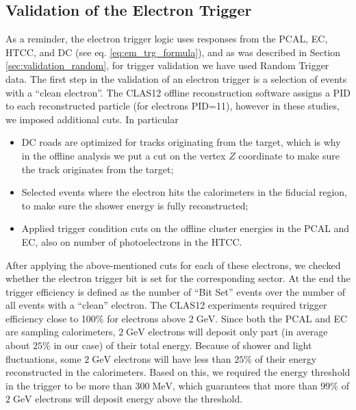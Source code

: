 \subsection{Validation of the Electron Trigger}
\label{electron_trigger_validation}
As a reminder, the electron trigger logic uses responses from the PCAL, EC, HTCC, and DC (see eq. \ref{eq:em_trg_formula}), and as was described in Section \ref{sec:validation_random}, for trigger validation we have used Random Trigger data. 
The first step in the validation of an electron trigger is a selection of  events with a ``clean electron''. The CLAS12 offline reconstruction software assigns a PID to each reconstructed particle \cite{offline-ref} (for electrons PID=11), however in these studies, we imposed additional cuts. 
In particular 
\begin{itemize}
 \item DC roads are optimized for tracks originating from the target, which is why in the offline analysis we put a cut on the vertex $Z$ coordinate to make sure the track originates from the target;
 \item Selected events where the electron hits the calorimeters in the fiducial region, to make sure the shower energy is fully reconstructed;
 \item Applied trigger condition cuts on the offline cluster energies in the PCAL and EC, also on number of photoelectrons in the HTCC.
\end{itemize}
After applying the above-mentioned cuts for each of these electrons, we checked whether the electron trigger bit is set for the corresponding sector. At the end the trigger efficiency is defined as the number of ``Bit  Set'' events over the number of all events with a ``clean'' electron.
The CLAS12 experiments required trigger efficiency close to 100\% for electrons above $\mathrm{2\;GeV}$. Since both the PCAL and EC are sampling calorimeters, $\mathrm{2\;GeV}$ electrons will deposit only part (in average about $25\%$ in our case) of their total energy. Because of shower and light fluctuations, some $\mathrm{2\;GeV}$ electrons will have less than $\mathrm{25\%}$ of their energy reconstructed in the calorimeters. Based on this, we required the energy threshold in the trigger to be more than $\mathrm{300 \; MeV}$, which guarantees that more than $\mathrm{99\%}$ of $\mathrm{2\;GeV}$ electrons will deposit energy above the threshold.

